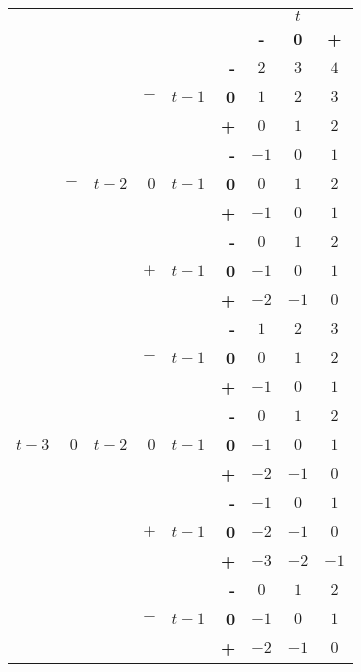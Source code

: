 \documentclass{article}[]
\begin{document}
\begin{center}
\begin{tabular}{r | r | r | r | r | r | c c c | }
 \multicolumn{5}{r}{} & \multicolumn{1}{r}{} &	\multicolumn{3}{c}{$t$} \\ \cline{7-9}
 \multicolumn{5}{r}{} & 		& \textbf{-} & \textbf{0} & \textbf{+} \\ \cline{2-2} \cline{4-4} \cline{6-9}

& & &	& &   \textbf{-} & $2$	& $3$	& $4$ \\ 
& & &  $-$ &$t-1$ & \textbf{0} & $1$	& $2$	& $3$	\\
& &      &   &		&    \textbf{+} & $0$	& $1$	& $2$ \\ \cline{4-4} \cline{6-9}

& &      &   &		&    \textbf{-} & $-1$	& $0$	& $1$ \\ 
& $-$ & $t-2$ & $0$   &$t-1$ & \textbf{0} & $0$	& $1$	& $2$	\\
& &      &   &		&    \textbf{+} & $-1$	& $0$	& $1$ \\  \cline{4-4} \cline{6-9}

& &      &   &		&    \textbf{-} & $0$	& $1$	& $2$ \\ 
& & &$+$   &$t-1$ & \textbf{0} & $-1$	& $0$	& $1$	\\
& &      &   &		&    \textbf{+} & $-2$	& $-1$	& $0$ \\ \cline{2-2} \cline{4-4} \cline{6-9}

& &     &	&	&    \textbf{-} & $1$	& $2$	& $3$ \\ 
& & &  $-$ &$t-1$ & \textbf{0} & $0$	& $1$	& $2$	\\
& &      &   &		&    \textbf{+} & $-1$	& $0$	& $1$ \\ \cline{4-4} \cline{6-9}

& &      &   &		&    \textbf{-} & $0$	& $1$	& $2$ \\ 
$t-3$ & $0$ & $t-2$ & $0$   &$t-1$ & \textbf{0} & $-1$	& $0$	& $1$	\\
& &      &   &		&    \textbf{+} & $-2$	& $-1$	& $0$ \\ \cline{4-4} \cline{6-9}

& &      &   &		&    \textbf{-} & $-1$	& $0$	& $1$ \\ 
& & &$+$   &$t-1$ & \textbf{0} & $-2$	& $-1$	& $0$	\\
& &      &   &		&    \textbf{+} & $-3$	& $-2$	& $-1$ \\ \cline{2-2} \cline{4-4} \cline{6-9}

& &     &	&	&    \textbf{-} & $0$	& $1$	& $2$ \\ 
& & &  $-$ &$t-1$ & \textbf{0} & $-1$	& $0$	& $1$	\\
& &      &   &		&    \textbf{+} & $-2$	& $-1$	& $0$ \\ \cline{4-4} \cline{6-9}


\end{tabular}
\end{center}
\end{document}
